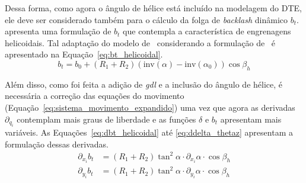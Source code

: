 Dessa forma, como agora o ângulo de hélice  está  incluído na modelagem do DTE, ele deve ser considerado também para o cálculo da folga de \textit{backlash} dinâmico $b_t$.~ apresenta uma formulação de $b_t$ que contempla a característica de engrenagens helicoidais. Tal  adaptação do modelo de~ considerando a formulação de~ é apresentado na Equação~\ref{eq:bt_helicoidal}. 
\begin{equation}
	b_t = b_0 + (R_1 + R_2) (\mathrm{inv}(\alpha) - \mathrm{inv}(\alpha_0)) \cos\beta_h
	\label{eq:bt_helicoidal}
\end{equation}

Além disso, como foi feita a adição de \textit{gdl} e a inclusão do ângulo de hélice, é necessária a correção das equações do movimento (Equação~\ref{eq:sistema_movimento_expandido}) uma vez que agora as derivadas  $\partial_{q_i}$ contemplam mais graus de liberdade e as funções $\delta$ e $b_t$ apresentam mais variáveis. As Equações~\ref{eq:dbt_helicoidal} até \ref{eq:ddelta_thetaz} apresentam a formulação dessas derivadas.
\begin{equation}
	\begin{aligned}
		\partial_{x_i}b_t &= (R_1 + R_2) \tan^2\alpha \cdot \partial_{x_i}\alpha \cdot \cos\beta_h \\
		\partial_{y_i}b_t &= (R_1 + R_2) \tan^2\alpha \cdot \partial_{y_i}\alpha \cdot \cos\beta_h
	\end{aligned}
	\label{eq:dbt_helicoidal}
\end{equation}

